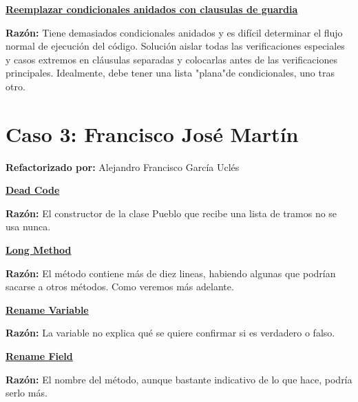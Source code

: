 \documentclass[11pt,a4paper,oneside]{book}
\begin{document}
\newline

   \hyperref[replaceNestedConditionalWithGuardClauses]{\textbf{\textbf{Reemplazar condicionales anidados con clausulas de guardia}}}
   \newline

   \textbf{Razón:} Tiene demasiados condicionales anidados y es difícil determinar el flujo normal de ejecución del código. Solución aislar todas las verificaciones especiales y casos extremos en cláusulas separadas y colocarlas antes de las verificaciones principales. Idealmente, debe tener una lista "plana"de condicionales, uno tras otro.
   
   

   \newline

   

\chapter {Caso 3: Francisco José Martín}
 \textbf{Refactorizado por:} Alejandro Francisco García Uclés \newline

    \hyperref[deadcode]{\textbf{Dead Code}}
    
    \textbf{Razón:} El constructor de la clase Pueblo que recibe una lista de tramos no se usa nunca.
    
    
    
    \hyperref[longmethod]{\textbf{Long Method}}
    
    \textbf{Razón:} El método contiene más de diez lineas, habiendo algunas que podrían sacarse a otros métodos. Como veremos más adelante.
    
    
    
    \hyperref[renamevariable]{\textbf{Rename Variable}}
    
    \textbf{Razón:} La variable no explica qué se quiere confirmar si es verdadero o falso.
    
    
    
    \hyperref[renamefield]{\textbf{Rename Field}}
    
    \textbf{Razón:} El nombre del método, aunque bastante indicativo de lo que hace, podría serlo más.
    
\end{document}
